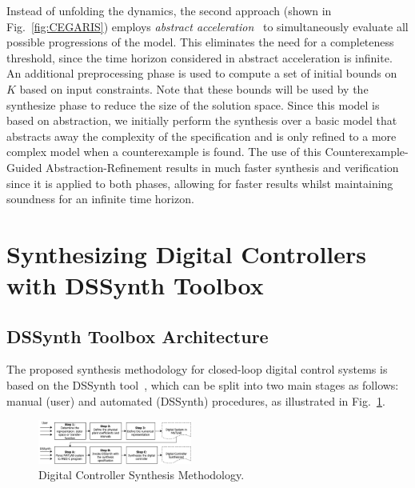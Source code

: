 \documentclass[10pt,conference]{IEEEtran}
\newcommand\tool{{DSSynth Toolbox}\xspace}
\begin{document}
Instead of unfolding the dynamics, the second approach (shown in
Fig.~\ref{fig:CEGARIS}) employs {\em abstract
acceleration}~\cite{cattaruzza2015unbounded} to simultaneously evaluate all
possible progressions of the model.  This eliminates the need for a
completeness threshold, since the time horizon considered in abstract
acceleration is infinite.  An additional preprocessing phase is used to
compute a set of initial bounds on $K$ based on input constraints.  Note
that these bounds will be used by the {\sc synthesize} phase to reduce the
size of the solution space.
%
Since this model is based on abstraction, we initially perform the synthesis
over a basic model that abstracts away the complexity of the specification
and is only refined to a more complex model when a counterexample is found.
%
%
The use of this Counterexample-Guided Abstraction-Refinement results in much
faster synthesis and verification since it is applied to both phases,
allowing for faster results whilst maintaining soundness for an infinite
time horizon.
 

\section{Synthesizing Digital Controllers with \tool}

\subsection{\tool Architecture}

The proposed synthesis methodology for closed-loop digital control
systems is based on the DSSynth tool~\cite{abate2017, abatecav2017}, 
which can be split into two main stages as follows: manual (user) and 
automated (DSSynth) procedures, as illustrated in Fig.~\ref{fig:synthesis-flow}. 
%
\begin{figure}[ht!]
\centering
\includegraphics[width=0.45\textwidth]{synthesis-flow.pdf}
\caption{Digital Controller Synthesis Methodology.}
\label{fig:synthesis-flow}
\end{figure}
\end{document}
